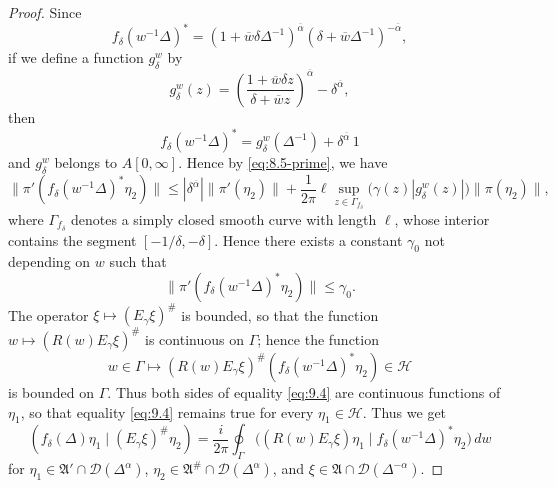 \documentclass[12pt,b5paper,twoside]{article}
\theoremstyle{takesaki}
\numberwithin{equation}{section}
\begin{document}
\begin{proof}
Since
\[
 f_\delta(w^{-1}\Delta)^*
 =(1+\overline w\delta\Delta^{-1})^{\overline\alpha}
  (\delta+\overline w\Delta^{-1})^{-\overline\alpha},
\]
if we define a function $g_\delta^w$ by
\[
 g_\delta^w(z)
 =\left(\frac{1+\overline w\delta z}
 {\delta+\overline w z}\right)^{\overline\alpha}
 -\delta^{\overline\alpha},
\]
then
\[
 f_\delta(w^{-1}\Delta)^*
 =g_\delta^w(\Delta^{-1})+\delta^{\overline\alpha}\,1
\]
and $g_\delta^w$ belongs to $A[0,\infty]$.  Hence by
\eqref{eq:8.5-prime}, we have
\[
 \|\pi'(f_\delta(w^{-1}\Delta)^*\eta_2)\|
 \leq |\delta^{\overline\alpha}|\|\pi'(\eta_2)\|
 +\frac{1}{2\pi}\ell
 \sup_{z\in\Gamma_{f_\delta}}
 \bigl(\gamma(z)|g_\delta^w(z)|\bigr)\|\pi(\eta_2)\|,
\]
where $\Gamma_{f_\delta}$ denotes a simply closed smooth curve with
length $\ell$, whose interior contains the segment
$[-1/\delta,-\delta]$.  Hence there exists a constant $\gamma_0$ not
depending on $w$ such that
\[
 \|\pi'(f_\delta(w^{-1}\Delta)^*\eta_2)\|\leq\gamma_0.
\]
The operator $\xi\mapsto(E_\gamma\xi)^{\#}$ is bounded, so that the
function $w\mapsto(R(w)E_\gamma\xi)^{\#}$ is continuous on $\Gamma$;
hence the function
\[
 w\in\Gamma\longmapsto
 (R(w)E_\gamma\xi)^{\#}
 (f_\delta(w^{-1}\Delta)^*\eta_2)\in\mathcal H
\]
is bounded on $\Gamma$.  Thus both sides of equality \eqref{eq:9.4}
are continuous functions of $\eta_1$, so that equality \eqref{eq:9.4}
remains true for every $\eta_1\in\mathcal H$.  Thus we get
\begin{equation}
 (f_\delta(\Delta)\eta_1\mid(E_\gamma\xi)^{\#}\eta_2)
 =\frac{i}{2\pi}\oint_\Gamma
 \bigl((R(w)E_\gamma\xi)\eta_1
 \mid f_\delta(w^{-1}\Delta)^*\eta_2\bigr)\,dw
 \tag{9.5}\label{eq:9.5}
\end{equation}
for $\eta_1\in\mathfrak A'\cap\mathcal D(\Delta^\alpha)$,
$\eta_2\in\mathfrak A^{\#}\cap\mathcal D(\Delta^\alpha)$, and
$\xi\in\mathfrak A\cap\mathcal D(\Delta^{-\alpha})$.


\end{proof}
\end{document}

